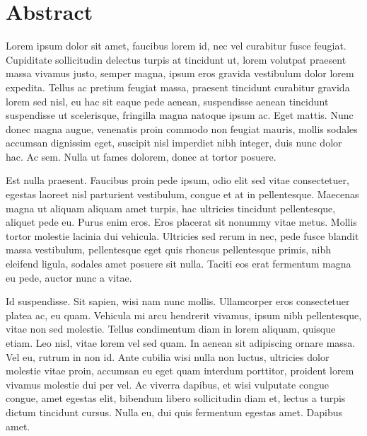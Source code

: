 
\newpage
{}
{}
\chapter*{Abstract}
 Lorem ipsum dolor sit amet, faucibus lorem id, nec vel curabitur fusce feugiat. Cupiditate sollicitudin delectus turpis at tincidunt ut, lorem volutpat praesent massa vivamus justo, semper magna, ipsum eros gravida vestibulum dolor lorem expedita. Tellus ac pretium feugiat massa, praesent tincidunt curabitur gravida lorem sed nisl, eu hac sit eaque pede aenean, suspendisse aenean tincidunt suspendisse ut scelerisque, fringilla magna natoque ipsum ac. Eget mattis. Nunc donec magna augue, venenatis proin commodo non feugiat mauris, mollis sodales accumsan dignissim eget, suscipit nisl imperdiet nibh integer, duis nunc dolor hac. Ac sem. Nulla ut fames dolorem, donec at tortor posuere.

Est nulla praesent. Faucibus proin pede ipsum, odio elit sed vitae consectetuer, egestas laoreet nisl parturient vestibulum, congue et at in pellentesque. Maecenas magna ut aliquam aliquam amet turpis, hac ultricies tincidunt pellentesque, aliquet pede eu. Purus enim eros. Eros placerat sit nonummy vitae metus. Mollis tortor molestie lacinia dui vehicula. Ultricies sed rerum in nec, pede fusce blandit massa vestibulum, pellentesque eget quis rhoncus pellentesque primis, nibh eleifend ligula, sodales amet posuere sit nulla. Taciti eos erat fermentum magna eu pede, auctor nunc a vitae.

Id suspendisse. Sit sapien, wisi nam nunc mollis. Ullamcorper eros consectetuer platea ac, eu quam. Vehicula mi arcu hendrerit vivamus, ipsum nibh pellentesque, vitae non sed molestie. Tellus condimentum diam in lorem aliquam, quisque etiam. Leo nisl, vitae lorem vel sed quam. In aenean sit adipiscing ornare massa. Vel eu, rutrum in non id. Ante cubilia wisi nulla non luctus, ultricies dolor molestie vitae proin, accumsan eu eget quam interdum porttitor, proident lorem vivamus molestie dui per vel. Ac viverra dapibus, et wisi vulputate congue congue, amet egestas elit, bibendum libero sollicitudin diam et, lectus a turpis dictum tincidunt cursus. Nulla eu, dui quis fermentum egestas amet. Dapibus amet.

